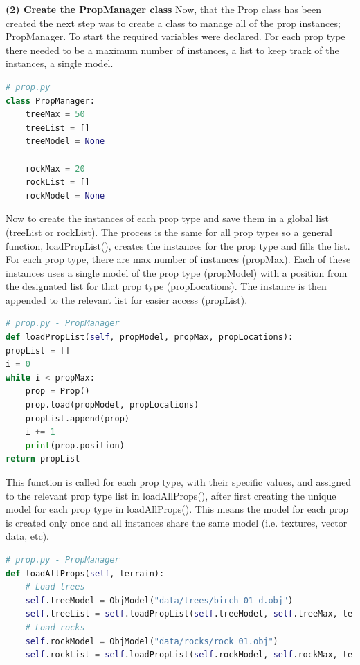 \documentclass[a4 paper, 12pt]{article}
\begin{document}
\textbf{(2) Create the PropManager class}
Now, that the Prop class has been created the next step was to create a class to manage all of the prop instances; PropManager. To start the required variables were declared. For each prop type there needed to be a maximum number of instances, a list to keep track of the instances, a single model.
    \begin{lstlisting}[language=python]
# prop.py
class PropManager: 
    treeMax = 50
    treeList = []
    treeModel = None

    rockMax = 20
    rockList = []
    rockModel = None
    \end{lstlisting} 

Now to create the instances of each prop type and save them in a global list (treeList or rockList). The process is the same for all prop types so a general function, loadPropList(), creates the instances for the prop type and fills the list. For each prop type, there are max number of instances (propMax). Each of these instances uses a single model of the prop type (propModel) with a position from the designated list for that prop type (propLocations). The instance is then appended to the relevant list for easier access (propList). 
    \begin{lstlisting}[language=python]
# prop.py - PropManager
def loadPropList(self, propModel, propMax, propLocations):
propList = []
i = 0
while i < propMax:
    prop = Prop()
    prop.load(propModel, propLocations)
    propList.append(prop)            
    i += 1
    print(prop.position)
return propList
    \end{lstlisting} 

This function is called for each prop type, with their specific values, and assigned to the relevant prop type list in loadAllProps(), after first creating the unique model for each prop type in loadAllProps(). This means the model for each prop is created only once and all instances share the same model (i.e. textures, vector data, etc). 
    \begin{lstlisting}[language=python]
# prop.py - PropManager 
def loadAllProps(self, terrain): 
    # Load trees
    self.treeModel = ObjModel("data/trees/birch_01_d.obj")
    self.treeList = self.loadPropList(self.treeModel, self.treeMax, terrain.treeLocations)
    # Load rocks
    self.rockModel = ObjModel("data/rocks/rock_01.obj")
    self.rockList = self.loadPropList(self.rockModel, self.rockMax, terrain.rockLocations)
    \end{lstlisting}
\end{document}
